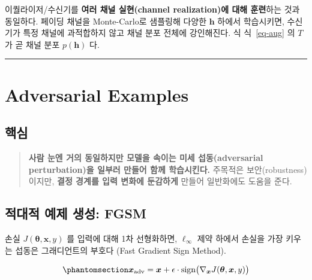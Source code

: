 \documentclass[
  letterpaper,
  DIV=11,
  numbers=noendperiod]{scrreprt}
\begin{document}
\begin{tcolorbox}[enhanced jigsaw, arc=.35mm, bottomrule=.15mm, bottomtitle=1mm, breakable, colback=white, colbacktitle=quarto-callout-note-color!10!white, colframe=quarto-callout-note-color-frame, coltitle=black, left=2mm, leftrule=.75mm, opacityback=0, opacitybacktitle=0.6, rightrule=.15mm, title=\textcolor{quarto-callout-note-color}{\faInfo}\hspace{0.5em}{무선통신 비유}, titlerule=0mm, toprule=.15mm, toptitle=1mm]

이퀄라이저/수신기를 \textbf{여러 채널 실현(channel realization)에 대해
훈련}하는 것과 동일하다. 페이딩 채널을 Monte-Carlo로 샘플링해 다양한
\(\bm{h}\) 하에서 학습시키면, 수신기가 특정 채널에 과적합하지 않고 채널
분포 전체에 강인해진다. 식 식~\ref{eq-aug} 의 \(T\) 가 곧 채널 분포
\(p(\bm{h})\) 다.

\end{tcolorbox}

\begin{center}\rule{0.5\linewidth}{0.5pt}\end{center}

\chapter{Adversarial Examples}\label{sec-adv}

\section{핵심}\label{uxd575uxc2ec-1}

\begin{quote}
\textbf{사람 눈엔 거의 동일하지만 모델을 속이는 미세 섭동(adversarial
perturbation)을 일부러 만들어 함께 학습시킨다.} 주목적은
보안(robustness)이지만, \textbf{결정 경계를 입력 변화에 둔감하게} 만들어
일반화에도 도움을 준다.
\end{quote}

\section{적대적 예제 생성:
FGSM}\label{uxc801uxb300uxc801-uxc608uxc81c-uxc0dduxc131-fgsm}

손실 \(J(\bm{\theta},\bm{x},y)\) 를 입력에 대해 1차 선형화하면,
\(\ell_\infty\) 제약 하에서 손실을 가장 키우는 섭동은 그래디언트의
부호다 (Fast Gradient Sign Method).

\begin{equation}\protect\phantomsection\label{eq-fgsm}{
\bm{x}_{\text{adv}} = \bm{x} + \epsilon \cdot \mathrm{sign}\big(\nabla_{\bm{x}} J(\bm{\theta},\bm{x},y)\big)
}\end{equation}
\end{document}
